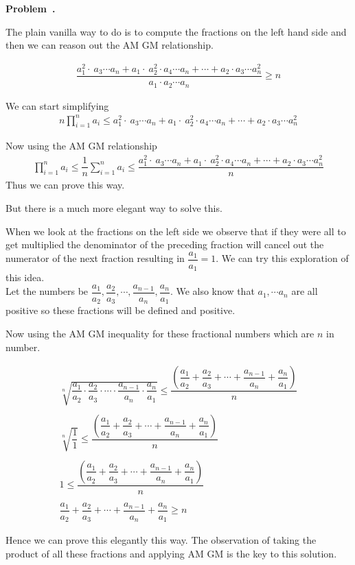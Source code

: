 \documentclass[10pt]{article}
\newcounter{problem}
\newenvironment{problem}[1][]{
  \refstepcounter{problem}
  \par\noindent\textbf{Problem~\theproblem. #1}\par
  \vspace{0.5em}
}{\vspace{1em}}
\begin{document}
\begin{problem} %
The plain vanilla way to do is to compute the fractions on the left hand side and then we can reason out the AM GM relationship.

\begin{gather*}
  \dfrac{a_1^2 \cdot \ a_3 \cdots a_n + a_1 \cdot \ a_2^2 \cdot a_4 \cdots a_n + \cdots + a_2 \cdot a_3 \cdots a_n^2}{a_1 \cdot a_2 \cdots a_n} \ge n
\end{gather*}

We can start simplifying
\begin{gather*}
n \prod_{i=1}^{n} a_i \le a_1^2 \cdot \ a_3 \cdots a_n + a_1 \cdot \ a_2^2 \cdot a_4 \cdots a_n + \cdots + a_2 \cdot a_3 \cdots a_n^2
\end{gather*}

Now using the AM GM relationship
\begin{gather*}
  \prod_{i=1}^{n} a_i \le \dfrac{1}{n} \sum_{i=1}^{n} a_i \le \dfrac{a_1^2 \cdot \ a_3 \cdots a_n + a_1 \cdot \ a_2^2 \cdot a_4 \cdots a_n + \cdots + a_2 \cdot a_3 \cdots a_n^2}{n}
\end{gather*}
Thus we can prove this way.

But there is a much more elegant way to solve this.

When we look at the fractions on the left side we observe that if they were all to get multiplied the denominator of the preceding fraction will cancel 
out the numerator of the next fraction resulting in $\dfrac{a_1}{a_1} = 1$. We can try this exploration of this idea.\\

Let the numbers be $\dfrac{a_1}{a_2}, \dfrac{a_2}{a_3}, \cdots , \dfrac{a_{n - 1}}{a_n}, \dfrac{a_n}{a_1}$. We also know that $a_1, \cdots a_n$ are all positive 
so these fractions will be defined and positive.

Now using the AM GM inequality for these fractional numbers which are $n$ in number.

\begin{gather*}
\sqrt[n]{\dfrac{a_1}{a_2} \cdot \dfrac{a_2}{a_3} \cdot \cdots \cdot \dfrac{a_{n - 1}}{a_n} \cdot \dfrac{a_n}{a_1}} \le \dfrac{\left(\dfrac{a_1}{a_2} + \dfrac{a_2}{a_3} + \cdots + \dfrac{a_{n - 1}}{a_n} + \dfrac{a_n}{a_1}\right)}{n}\\\\
\sqrt[n]{\dfrac{1}{1}} \le \dfrac{\left(\dfrac{a_1}{a_2} + \dfrac{a_2}{a_3} + \cdots + \dfrac{a_{n - 1}}{a_n} + \dfrac{a_n}{a_1}\right)}{n}\\\\
1 \le \dfrac{\left(\dfrac{a_1}{a_2} + \dfrac{a_2}{a_3} + \cdots + \dfrac{a_{n - 1}}{a_n} + \dfrac{a_n}{a_1}\right)}{n}\\\\
\dfrac{a_1}{a_2} + \dfrac{a_2}{a_3} + \cdots + \dfrac{a_{n - 1}}{a_n} + \dfrac{a_n}{a_1} \ge n
\end{gather*}

Hence we can prove this elegantly this way. The observation of taking the product of all these fractions and applying AM GM is the key to this solution.
\end{problem}
\end{document}
